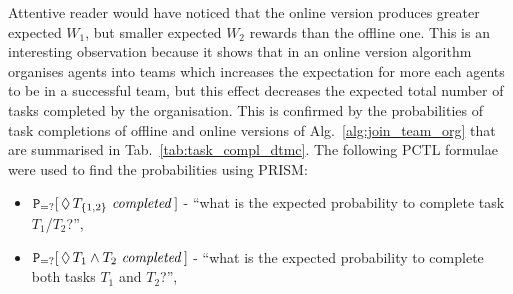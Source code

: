 \documentclass{llncs}
\begin{document}
\begin{table}[H]
 \centering
{}
\caption{Task completion probabilities for optimal agent organisations using Alg.~\ref{alg:join_team_org}'s offline and online versions (see Alg.~\ref{alg:main_process}).}
\label{tab:task_compl_dtmc}
\end{table}

Attentive reader would have noticed that the online version produces greater expected $W_1$, but smaller expected $W_2$ rewards than the offline one. This is an interesting observation because it shows that in an online version algorithm organises agents into teams which increases the expectation for more each agents to be in a successful team, but this effect decreases the expected total number of tasks completed by the organisation. This is confirmed by the probabilities of task completions of offline and online versions of Alg.~\ref{alg:join_team_org} that are summarised in Tab.~\ref{tab:task_compl_dtmc}. The following PCTL formulae were used to find the probabilities using PRISM:
\begin{itemize}
 \item ${\tt P}_{=?}[\,\Diamond\,T_{\{1,2\}} \mathit{\ completed}\,]$ -
``what is the expected probability to complete  task $T_1$/$T_2$?'',
 \item ${\tt P}_{=?}[\,\Diamond\,T_{1} \wedge T_2 \mathit{\ completed}\,]$ -
``what is the expected probability to complete  both tasks $T_1$ and $T_2$?'',
\end{itemize}
\end{document}
